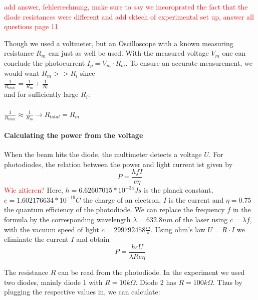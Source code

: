 \documentclass{article}
\begin{document}
\textcolor{red}{add answer, fehlerrechnung, make sure to say we incoroprated the fact that the diode resistances were different and add sktech of experimental set up, answer all questions page 11}

Though we used a voltmeter, but an Oscilloscope with a known measuring resistance $R_m$ can just as well be used. With the measured voltage $V_m$ one can conclude the photocurrent $I_p = V_m \cdot R_m$. To ensure an accurate measurement, we would want $R_m >>R_i$ since\\


$\frac{1}{R_{total}}= \frac{1}{R_m}+\frac{1}{R_i}$\\


and for sufficiently large $R_i$:\\
$\hspace{3cm}$\\
$\frac{1}{R_{total}} \approx \frac{1}{R_m} \rightarrow R_{total} = R_m$\\


\paragraph{Calculating the power from the voltage}

When the beam hits the diode, the multimeter detects a voltage $U$. For photodiodes, the relation between the power and light current ist given by 
\begin{equation} 
P = \frac{hfI}{e\eta}
\end{equation}
\cite{https://de.wikipedia.org/wiki/Quantenausbeute}
\textcolor{red}{Wie zitieren?}
Here, $h = 6.62607015*10^{-34} Js$ is the planck constant, $e = 1.602176634*10^{-19} C$ the charge of an electron, $I$ is the current and $\eta = 0.75$ the quantum efficiency of the photodiode. We can replace the frequency $f$ in the formula by the corresponding wavelength $\lambda = 632.8 nm$ of the laser using $c= \lambda f$, with the vacuum speed of light  $c = 299792458 \frac{m}{s}$. Using ohm's law $ U= R \cdot I$ we eliminate the current $I$ and obtain 
\begin{equation}
P = \frac{hcU}{\lambda Re \eta}
\label{powerfromvoltage}
\end{equation}

The resistance $R$ can be read from the photodiode. In the experiment we used two diodes, mainly diode 1 with $R=10 k\Omega$. Diode 2 has $R= 100 k\Omega$. Thus by plugging the respective values in, we can calculate:\\
\end{document}
